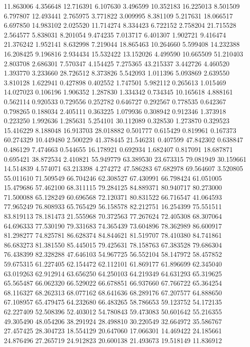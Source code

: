 11.863006
4.356648
12.716391
6.107630
3.496599
10.352183
16.225013
8.501509
6.797807
12.493441
2.765975
3.771822
3.009995
8.381109
5.217631
18.066517
6.697850
14.983102
2.025520
11.714274
8.334423
6.722152
2.758204
21.715528
2.564577
5.838031
8.201054
9.474235
7.013717
6.401307
1.902721
9.416474
21.376242
1.952141
8.632998
7.219044
18.865463
10.264660
5.599408
14.232388
16.208425
9.196816
2.934434
15.532422
13.152026
4.499590
10.665509
51.210403
2.803708
2.686301
7.570347
4.154425
7.275365
43.215337
3.442726
4.460520
1.393770
3.233660
28.726512
8.373826
5.542093
1.011396
5.093869
2.639550
3.810128
1.622941
0.427898
0.402552
1.747501
5.982112
0.265613
1.015469
14.027023
0.106196
1.906352
1.287830
1.334342
0.734345
10.165618
4.888161
0.562114
0.920533
0.729556
0.252782
0.646727
0.292567
0.778535
0.642367
0.798265
0.188034
2.405111
0.363225
1.079936
0.308942
0.912346
1.373918
0.223250
1.992636
1.285631
5.254101
30.112089
0.328530
1.273870
0.329523
15.416229
8.188048
16.913703
28.018882
0.501777
0.615429
0.819961
0.167373
60.274329
10.449480
2.500229
41.378445
21.546231
0.407599
47.842302
0.638847
0.486129
7.474663
0.544655
16.178921
0.692934
1.682407
0.817091
18.687871
0.695421
38.872534
2.410821
55.949779
63.389530
23.673315
79.081949
30.159661
14.514839
4.574071
63.213398
4.274272
47.586283
67.682978
69.564607
3.520805
55.011610
71.509549
66.704246
62.308527
67.430991
66.798424
61.051005
15.479686
57.462100
68.311115
79.284125
84.889371
80.940717
80.273000
71.500088
65.128249
60.696568
72.120371
80.831522
66.716547
41.064593
77.965249
76.808933
65.765429
56.158578
82.212751
16.254399
75.551511
83.819113
78.181473
21.555968
70.372563
77.267624
72.405308
68.307064
64.696333
77.530190
79.331683
74.365439
73.604896
78.362989
86.600917
81.298277
74.825781
86.628374
84.844621
81.519707
78.410380
84.741861
86.683273
81.381550
85.445015
79.425631
78.158763
67.383528
79.686304
76.438399
82.328288
47.646103
54.967725
56.552104
58.147972
58.457852
59.675315
61.227405
62.154472
62.112101
61.869177
61.896699
62.345040
63.019263
62.912914
63.656250
64.250103
64.219349
64.631293
65.319625
65.565487
66.062320
66.529022
66.678851
66.937660
67.766722
65.364254
68.116327
68.262313
68.077162
68.641636
68.289176
67.207577
64.888650
67.108957
65.479475
64.232680
66.483265
58.786653
59.123752
54.172135
62.227409
52.508396
52.403012
54.780843
59.473083
50.601642
55.216355
49.305490
48.054206
38.291924
28.498810
30.220549
32.664972
35.586767
27.457425
28.304723
18.554129
20.647060
17.066301
14.469422
24.185661
24.876496
27.265719
24.912823
20.600138
21.493673
19.518149
11.836912
